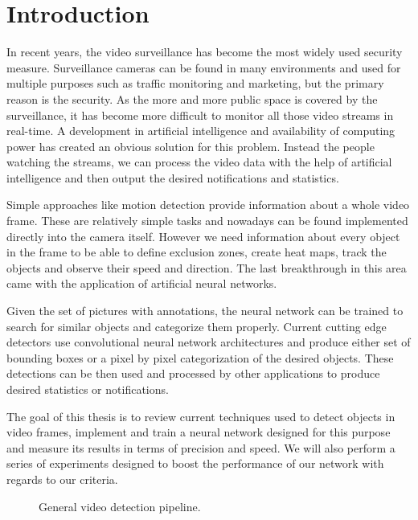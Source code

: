\chapter*{Introduction}

In recent years, the video surveillance has become the most widely used security measure. Surveillance cameras can be found in many environments and used for multiple purposes such as traffic monitoring and marketing, but the primary reason is the security. As the more and more public space is covered by the surveillance, it has become more difficult to monitor all those video streams in real-time. A development in artificial intelligence and availability of computing power has created an obvious solution for this problem. Instead the people watching the streams, we can process the video data with the help of artificial intelligence and then output the desired notifications and statistics. 

Simple approaches like motion detection provide information about a whole video frame. These are relatively simple tasks and nowadays can be found implemented directly into the camera itself. However we need information about every object in the frame to be able to define exclusion zones, create heat maps, track the objects and observe their speed and direction. The last breakthrough in this area came with the application of artificial neural networks.

Given the set of pictures with annotations, the neural network can be trained to search for similar objects and categorize them properly. Current cutting edge detectors use convolutional neural network architectures and produce either set of bounding boxes or a pixel by pixel categorization of the desired objects. These detections can be then used and processed by other applications to produce desired statistics or notifications. 

The goal of this thesis is to review current techniques used to detect objects in video frames, implement and train a neural network designed for this purpose and measure its results in terms of precision and speed. We will also perform a series of experiments designed to boost the performance of our network with regards to our criteria. 


\begin{figure}
    \centering
    \pipeline
    \caption[General video detection pipeline]%
    {General video detection pipeline.}
    \label{fig:pipeline}
\end{figure}

